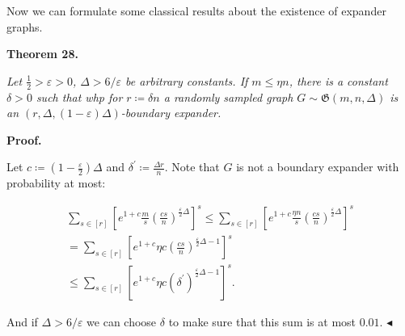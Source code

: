 \documentclass[10pt,a4paper]{article}
\begin{document}
Now we can formulate some classical results about the existence of expander graphs.\par





\par\medskip\noindent\textbf{
\textbf{Theorem 28}\textbf{.}
}\par



\emph{Let $\frac{1}{2}>\varepsilon>0$, $\Delta>6/\varepsilon$ be arbitrary constants. If $m\leq\eta n$, there is a constant $\delta>0$ such that whp for $r\coloneqq\delta n$ a randomly sampled
graph $G\sim\mathfrak{G}(m,n,\Delta)$ is an $(r,\Delta,(1-\varepsilon)\Delta)$-boundary
expander.}\par






\par\medskip\noindent\textbf{Proof.}\par




Let $c\coloneqq(1-\frac{\varepsilon}{2})\Delta$ and $\delta^{\prime}\coloneqq\frac{\Delta r}{n}$. Note
that $G$ is not a boundary expander with probability at most:\par


\[\begin{gathered}
\displaystyle\sum\limits_{s\in[r]}\left[e^{1+c}\frac{m}{s}\left(\frac{cs}{n}%
\right)^{\frac{\varepsilon}{2}\Delta}\right]^{s} \displaystyle\leq\sum\limits_{s\in[r]}\left[e^{1+c}\frac{\eta n}{s}\left(\frac%
{cs}{n}\right)^{\frac{\varepsilon}{2}\Delta}\right]^{s} \\
\displaystyle=\sum\limits_{s\in[r]}\left[e^{1+c}\eta c\left(\frac{cs}{n}\right%
)^{\frac{\varepsilon}{2}\Delta-1}\right]^{s} \\
\displaystyle\leq\sum\limits_{s\in[r]}\left[e^{1+c}\eta c\left(\delta^{\prime}%
\right)^{\frac{\varepsilon}{2}\Delta-1}\right]^{s}.
\end{gathered}\]




And if $\Delta>6/\varepsilon$ we can choose $\delta$ to make sure that this sum is at most
$0.01$.
$\blacktriangleleft$\par



\end{document}
